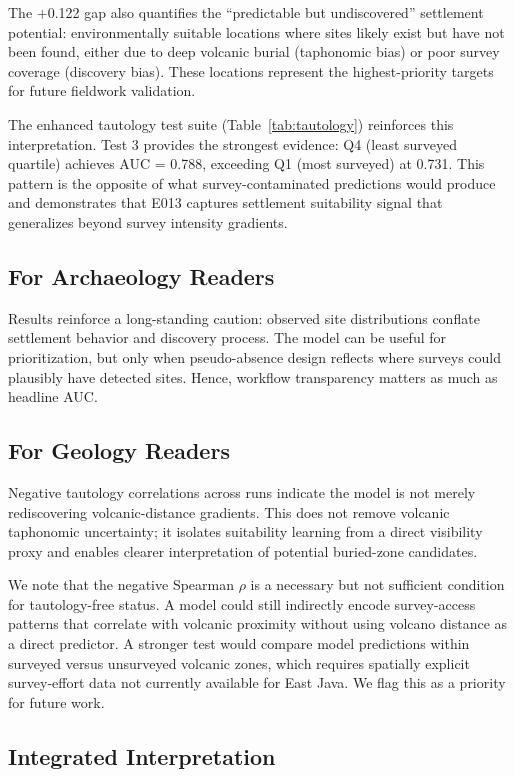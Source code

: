 \documentclass[12pt]{article}
\begin{document}
The $+$0.122 gap also quantifies the ``predictable but undiscovered'' settlement potential: environmentally suitable locations where sites likely exist but have not been found, either due to deep volcanic burial (taphonomic bias) or poor survey coverage (discovery bias). These locations represent the highest-priority targets for future fieldwork validation.

The enhanced tautology test suite (Table~\ref{tab:tautology}) reinforces this interpretation. Test 3 provides the strongest evidence: Q4 (least surveyed quartile) achieves AUC = 0.788, exceeding Q1 (most surveyed) at 0.731. This pattern is the opposite of what survey-contaminated predictions would produce and demonstrates that E013 captures settlement suitability signal that generalizes beyond survey intensity gradients.

\subsection{For Archaeology Readers}

Results reinforce a long-standing caution: observed site distributions conflate settlement behavior and discovery process.
The model can be useful for prioritization, but only when pseudo-absence design reflects where surveys could plausibly have detected sites.
Hence, workflow transparency matters as much as headline AUC.

\subsection{For Geology Readers}

Negative tautology correlations across runs indicate the model is not merely rediscovering volcanic-distance gradients.
This does not remove volcanic taphonomic uncertainty; it isolates suitability learning from a direct visibility proxy and enables clearer interpretation of potential buried-zone candidates.

We note that the negative Spearman $\rho$ is a necessary but not sufficient condition for tautology-free status. A model could still indirectly encode survey-access patterns that correlate with volcanic proximity without using volcano distance as a direct predictor. A stronger test would compare model predictions within surveyed versus unsurveyed volcanic zones, which requires spatially explicit survey-effort data not currently available for East Java. We flag this as a priority for future work.

\subsection{Integrated Interpretation}
\end{document}

